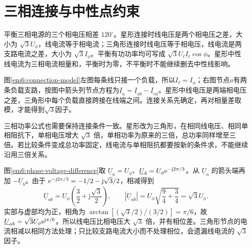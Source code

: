 \section{三相连接与中性点约束}

平衡三相电源的三个相电压相差 $120^\circ$。星形连接时线电压是两个相电压之差，大小为 $\sqrt3U_\phi$，线电流等于相电流；三角形连接时线电压等于相电压，线电流是两支路电流之差，大小为 $\sqrt3I_\phi$。平衡有功功率均可写成 $\sqrt3U_\ell I_\ell\cos\phi$。星形中性线电流为三相电流相量和，平衡时为零，不平衡时不能继续删去中性线影响。

图\ref{em6:connection-model}左图每条线只接一个负载，所以$I_\ell=I_\phi$；右图节点$a$有两条负载支路，按图中箭头列节点方程为$\underline I_a=\underline I_{ab}-\underline I_{ca}$。星形中线电压是两端相电压之差，三角形中每个负载直接跨接在线端之间。连接关系先确定，再对相量差取模，才能得到$\sqrt3$因子。



三相功率公式也需要保持连接条件一致。星形改为三角形，在相同线电压、相同单相阻抗下，单相电压增大 $\sqrt3$ 倍，单相功率为原来的三倍，总功率同样增至三倍。若比较条件变成总功率固定，线电流与单相阻抗都要按新的条件求，不能继续沿用三倍关系。

图\ref{em6:phase-voltage-difference}取 $\underline U_a=U_\phi$、$\underline U_b=U_\phi\mathrm e^{-\mathrm j2\pi/3}$。从 $\underline U_a$ 的箭头端再加 $-\underline U_b$。由于 $\mathrm e^{-\mathrm j2\pi/3}=-1/2-\mathrm j\sqrt3/2$，相减得到
\[
 \underline U_{ab}=U_\phi\left(\frac32+\mathrm j\frac{\sqrt3}{2}\right),\qquad
 |\underline U_{ab}|=U_\phi\sqrt{\frac94+\frac34}=\sqrt3U_\phi.
\]
实部与虚部均为正，相角为 $\arctan[(\sqrt3/2)/(3/2)]=\pi/6$，故 $\underline U_{ab}=\sqrt3U_\phi\mathrm e^{\mathrm j\pi/6}$。所以线电压比相电压大 $\sqrt3$ 倍，并有相位差。三角形节点的电流相减以相同方法处理；只比较支路电流大小而不处理相位，会遗漏线电流的 $\sqrt3$ 因子。


